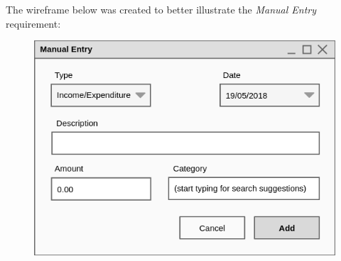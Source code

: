 The wireframe below was created to better illustrate the \emph{Manual Entry} requirement:
\begin{figure}[ht!]
  \begin{center}
    \includegraphics[width=14cm]{./contents/img/Wireframe_-_Manual_Entry.png}
  \end{center}
\end{figure}
\FloatBarrier
